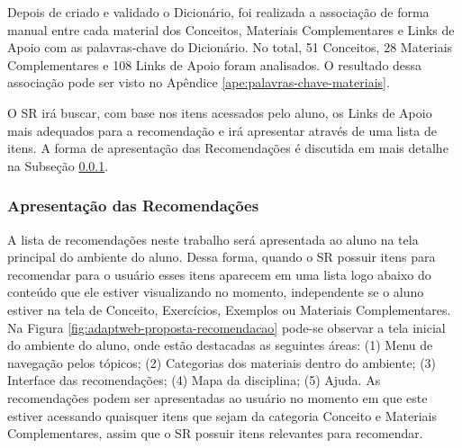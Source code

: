 Depois de criado e validado o Dicionário, foi realizada a associação de forma manual entre cada material dos Conceitos,
Materiais Complementares e Links de Apoio com as palavras-chave do Dicionário. No total, 51 Conceitos, 28 Materiais
Complementares e 108 Links de Apoio foram analisados. O resultado dessa associação pode ser visto no Apêndice \ref{ape:palavras-chave-materiais}.

O SR irá buscar, com base nos itens acessados pelo aluno, os Links de Apoio mais adequados
para a recomendação e irá apresentar através de uma lista de itens. A forma de apresentação das Recomendações é discutida
em mais detalhe na Subseção \ref{subsection:apresentacao-recomendacoes}.

\subsubsection{Apresentação das Recomendações}\label{subsection:apresentacao-recomendacoes}

A lista de recomendações neste trabalho será apresentada ao aluno na tela principal do ambiente do aluno. Dessa forma,
quando o SR possuir itens para recomendar para o usuário esses itens aparecem em uma lista logo abaixo do conteúdo que
ele estiver visualizando no momento, independente se o aluno estiver na tela de Conceito, Exercícios, Exemplos ou
Materiais Complementares. Na Figura \ref{fig:adaptweb-proposta-recomendacao} pode-se observar a tela inicial do ambiente do
aluno, onde estão destacadas as seguintes áreas: (1) Menu de navegação pelos tópicos; (2) Categorias dos materiais dentro
do ambiente; (3) Interface das recomendações; (4) Mapa da disciplina; (5) Ajuda. As recomendações podem ser apresentadas ao usuário no momento em que este estiver acessando
quaisquer itens que sejam da categoria Conceito e Materiais Complementares, assim que o SR possuir itens relevantes para recomendar.


